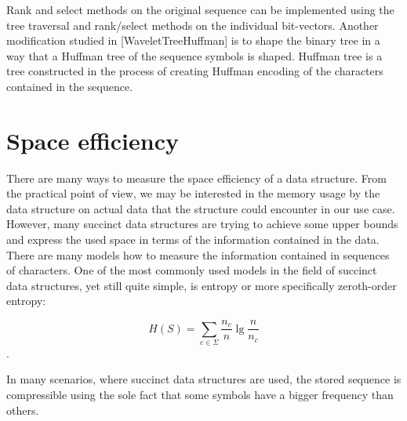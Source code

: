 Rank and select methods on the original sequence can be implemented using the tree
traversal and rank/select methods on the individual bit-vectors. Another modification
studied in [WaveletTreeHuffman] is to shape the binary tree in a way that a Huffman
tree of the sequence symbols is shaped. Huffman tree is a tree constructed in the
process of creating Huffman encoding of the characters contained in the sequence.

\section{Space efficiency}

There are many ways to measure the space efficiency of a data structure. From the
practical point of view, we may be interested in the memory usage by the data
structure on actual data that the structure could encounter in our use case. However,
many succinct data structures are trying to achieve some upper bounds and express
the used space in terms of the information contained in the data. There are many
models how to measure the information contained in sequences of characters. One
of the most commonly used models in the field of succinct data structures, yet still
quite simple, is entropy or more specifically zeroth-order entropy:

$$H(S)=\sum_{c\in\Sigma} \frac{n_c}{n} \lg \frac{n}{n_c}$$.

In many scenarios, where succinct data structures are used, the stored sequence
is compressible using the sole fact that some symbols have a bigger frequency than others.

\cite{raman2007succinct}
